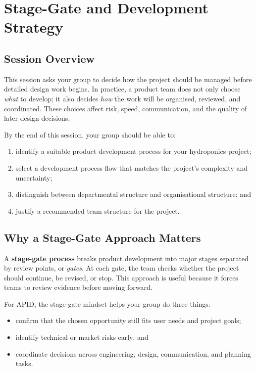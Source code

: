\chapter{Stage-Gate and Development Strategy}

\section{Session Overview}

This session asks your group to decide how the project should be managed before detailed design work begins. In practice, a product team does not only choose \emph{what} to develop; it also decides \emph{how} the work will be organised, reviewed, and coordinated. These choices affect risk, speed, communication, and the quality of later design decisions.

By the end of this session, your group should be able to:
\begin{enumerate}
    \item identify a suitable product development process for your hydroponics project;
    \item select a development process flow that matches the project's complexity and uncertainty;
    \item distinguish between departmental structure and organisational structure; and
    \item justify a recommended team structure for the project.
\end{enumerate}

\section{Why a Stage-Gate Approach Matters}

A \textbf{stage-gate process} breaks product development into major stages separated by review points, or \emph{gates}. At each gate, the team checks whether the project should continue, be revised, or stop. This approach is useful because it forces teams to review evidence before moving forward.

For APID, the stage-gate mindset helps your group do three things:
\begin{itemize}
    \item confirm that the chosen opportunity still fits user needs and project goals;
    \item identify technical or market risks early; and
    \item coordinate decisions across engineering, design, communication, and planning tasks.
\end{itemize}

